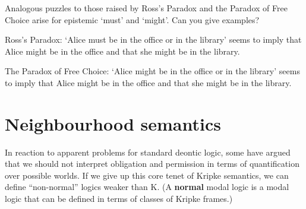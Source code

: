 
\begin{exercise}
  Analogous puzzles to those raised by Ross's Paradox and the Paradox of Free
  Choice arise for epistemic `must' and `might'. Can you give examples?
\end{exercise}
\begin{solution}
  Ross's Paradox: `Alice must be in the office or in the library'
  seems to imply that Alice might be in the office and that she might
  be in the library.

  The Paradox of Free Choice: `Alice might be in the office or in the
  library' seems to imply that Alice might be in the office and that
  she might be in the library.
\end{solution}


\section{Neighbourhood semantics}\label{sec:neighbourhood}

In reaction to apparent problems for standard deontic logic, some have argued
that we should not interpret obligation and permission in terms of
quantification over possible worlds. If we give up this core tenet of Kripke
semantics, we can define ``non-normal'' logics weaker than K. (A \textbf{normal}
modal logic is a modal logic that can be defined in terms of classes of Kripke
frames.)

